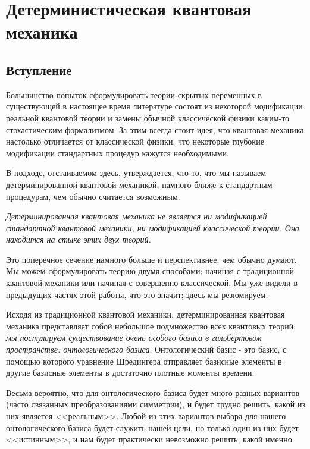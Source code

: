 \documentclass[main.tex]{subfiles}
\begin{document}
\section{Детерминистическая квантовая механика}\label{ch4}

\subsection{Вступление}\label{ch4.1}

Большинство попыток сформулировать теории скрытых переменных в существующей в настоящее время литературе состоят из некоторой модификации реальной квантовой теории и замены обычной классической физики каким-то стохастическим формализмом. За этим всегда стоит идея, что квантовая механика настолько отличается от классической физики, что некоторые глубокие модификации стандартных процедур кажутся необходимыми.

В подходе, отстаиваемом здесь, утверждается, что то, что мы называем детерминированной квантовой механикой, намного ближе к стандартным процедурам, чем обычно считается возможным.

\textit{Детерминированная квантовая механика не является ни модификацией стандартной квантовой механики, ни модификацией классической теории. Она находится на стыке этих двух теорий.}

Это поперечное сечение намного больше и перспективнее, чем обычно думают. Мы можем сформулировать теорию двумя способами: начиная с традиционной квантовой механики или начиная с совершенно классической. Мы уже видели в предыдущих частях этой работы, что это значит; здесь мы резюмируем.

Исходя из традиционной квантовой механики, детерминированная квантовая механика представляет собой небольшое подмножество всех квантовых теорий: \textit{мы постулируем существование очень особого базиса в гильбертовом пространстве: онтологического базиса}. Онтологический базис - это базис, с помощью которого уравнение Шредингера отправляет базисные элементы в другие базисные элементы в достаточно плотные моменты времени.

Весьма вероятно, что для онтологического базиса будет много разных вариантов (часто связанных преобразованиями симметрии), и будет трудно решить, какой из них является <<реальным>>. Любой из этих вариантов выбора для нашего онтологического базиса будет служить нашей цели, но только один из них будет <<истинным>>, и нам будет практически невозможно решить, какой именно.
\end{document}
